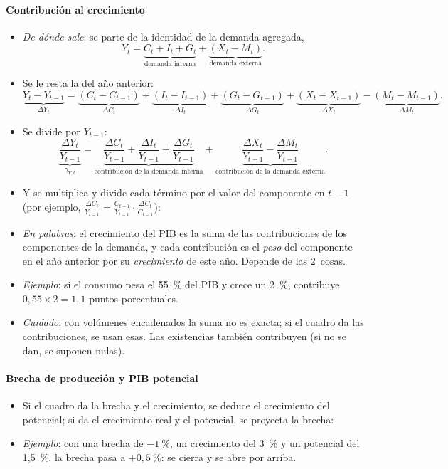 \documentclass[11pt]{article}
\begin{document}
\paragraph{Contribución al crecimiento}
\begin{itemize}
\item \emph{De dónde sale}: se parte de la identidad de la demanda agregada,
\[
Y_t=\underbrace{C_t+I_t+G_t}_{\text{demanda interna}}+\underbrace{(X_t-M_t)}_{\text{demanda externa}} .
\]
\item Se le resta la del año anterior:
\[
\underbrace{Y_t-Y_{t-1}}_{\Delta Y_t}=\underbrace{(C_t-C_{t-1})}_{\Delta C_t}+\underbrace{(I_t-I_{t-1})}_{\Delta I_t}+\underbrace{(G_t-G_{t-1})}_{\Delta G_t}+\underbrace{(X_t-X_{t-1})}_{\Delta X_t}-\underbrace{(M_t-M_{t-1})}_{\Delta M_t} .
\]
\item Se divide por $Y_{t-1}$:
\[
\underbrace{\frac{\Delta Y_t}{Y_{t-1}}}_{\gamma_{Y,t}}=\underbrace{\frac{\Delta C_t}{Y_{t-1}}+\frac{\Delta I_t}{Y_{t-1}}+\frac{\Delta G_t}{Y_{t-1}}}_{\text{contribución de la demanda interna}}+\underbrace{\frac{\Delta X_t}{Y_{t-1}}-\frac{\Delta M_t}{Y_{t-1}}}_{\text{contribución de la demanda externa}} .
\]
\item Y se multiplica y divide cada término por el valor del componente en $t-1$ (por ejemplo, $\frac{\Delta C_t}{Y_{t-1}}=\frac{C_{t-1}}{Y_{t-1}}\cdot\frac{\Delta C_t}{C_{t-1}}$):
\item \emph{En palabras}: el crecimiento del PIB es la suma de las contribuciones de los componentes de la demanda, y cada contribución es el \emph{peso} del componente en el año anterior por su \emph{crecimiento} de este año. Depende de las 2~cosas.
\item \emph{Ejemplo}: si el consumo pesa el 55~\% del PIB y crece un 2~\%, contribuye $0{,}55\times2=1{,}1$ puntos porcentuales.
\item \emph{Cuidado}: con volúmenes encadenados la suma no es exacta; si el cuadro da las contribuciones, se usan esas. Las existencias también contribuyen (si no se dan, se suponen nulas).
\end{itemize}

\paragraph{Brecha de producción y PIB potencial}
\begin{itemize}
\item Si el cuadro da la brecha y el crecimiento, se deduce el crecimiento del potencial; si da el crecimiento real y el potencial, se proyecta la brecha:
\item \emph{Ejemplo}: con una brecha de $-1~\%$, un crecimiento del 3~\% y un potencial del 1,5~\%, la brecha pasa a $+0{,}5~\%$: se cierra y se abre por arriba.
\end{itemize}
\end{document}
